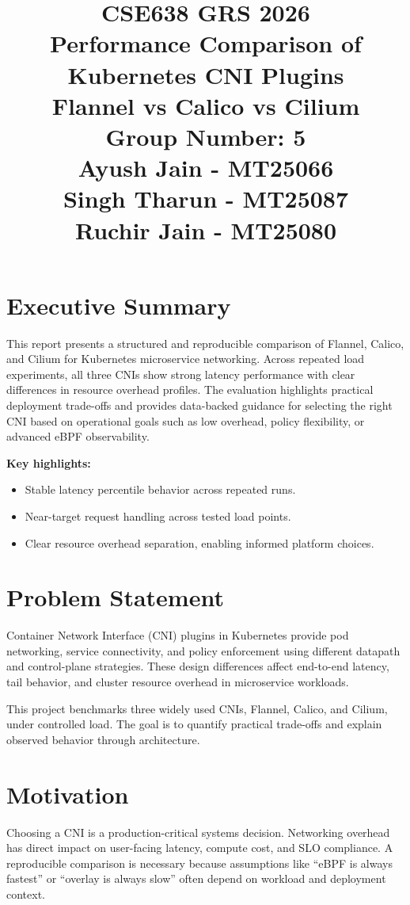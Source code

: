 \documentclass[12pt,a4paper]{article}
\title{\textbf{CSE638 GRS 2026}\\[0.6em]
\textbf{Performance Comparison of Kubernetes CNI Plugins}\\
\large Flannel vs Calico vs Cilium\\[0.6em]
\normalsize Group Number: 5\\
Ayush Jain - MT25066\\Singh Tharun - MT25087\\Ruchir Jain - MT25080}
\author{}
\date{}
\begin{document}
\maketitle
\tableofcontents
\newpage

\section{Executive Summary}
This report presents a structured and reproducible comparison of Flannel, Calico, and Cilium for Kubernetes microservice networking. Across repeated load experiments, all three CNIs show strong latency performance with clear differences in resource overhead profiles. The evaluation highlights practical deployment trade-offs and provides data-backed guidance for selecting the right CNI based on operational goals such as low overhead, policy flexibility, or advanced eBPF observability.

\textbf{Key highlights:}
\begin{itemize}[leftmargin=1.5em]
    \item Stable latency percentile behavior across repeated runs.
    \item Near-target request handling across tested load points.
    \item Clear resource overhead separation, enabling informed platform choices.
\end{itemize}

\section{Problem Statement}
Container Network Interface (CNI) plugins in Kubernetes provide pod networking, service connectivity, and policy enforcement using different datapath and control-plane strategies. These design differences affect end-to-end latency, tail behavior, and cluster resource overhead in microservice workloads.

This project benchmarks three widely used CNIs, Flannel, Calico, and Cilium, under controlled load. The goal is to quantify practical trade-offs and explain observed behavior through architecture.

\section{Motivation}
Choosing a CNI is a production-critical systems decision. Networking overhead has direct impact on user-facing latency, compute cost, and SLO compliance. A reproducible comparison is necessary because assumptions like ``eBPF is always fastest'' or ``overlay is always slow'' often depend on workload and deployment context.
\end{document}

